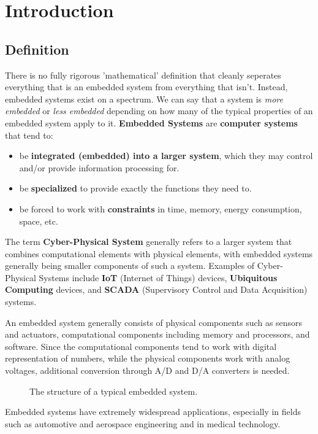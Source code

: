 \documentclass{report}
\newcommand{\tbf}{\textbf}
\newcommand*{\newpar}{\par\vspace{\baselineskip}\noindent} %
\begin{document}

\tableofcontents
\thispagestyle{fancy}
\chapter{Introduction}
\thispagestyle{fancy}
\section{Definition}
There is no fully rigorous 'mathematical' definition that cleanly seperates everything that is an embedded system from everything that isn't. Instead, embedded systems exist on a spectrum. We can say that a system is \textit{more embedded} or \textit{less embedded} depending on how many of the typical properties of an embedded system apply to it. \tbf{Embedded Systems} are \tbf{computer systems} that tend to:
\begin{itemize}
    \item be \tbf{integrated (embedded) into a larger system}, which they may control and/or provide information processing for.
    \item be \tbf{specialized} to provide exactly the functions they need to.
    \item be forced to work with \tbf{constraints} in time, memory, energy consumption, space, etc.
\end{itemize}
The term \tbf{Cyber-Physical System} generally refers to a larger system that combines computational elements with physical elements, with embedded systems generally being smaller components of such a system.
Examples of Cyber-Physical Systems include \tbf{IoT} (Internet of Things) devices, \tbf{Ubiquitous Computing} devices, and \tbf{SCADA} (Supervisory Control and Data Acquisition) systems.
\newpar
An embedded system generally consists of physical components such as sensors and actuators, computational components including memory and processors, and software. Since the computational components tend to work with digital representation of numbers, while the physical components work with analog voltages, additional conversion through A/D and D/A converters is needed.

\begin{figure}[h!]
\centering

\caption{The structure of a typical embedded system.}
\label{fig:embeddedsystemstructure}
\end{figure}

\newpar
Embedded systems have extremely widespread applications, especially in fields such as automotive and aerospace engineering and in medical technology.
%
\end{document}
